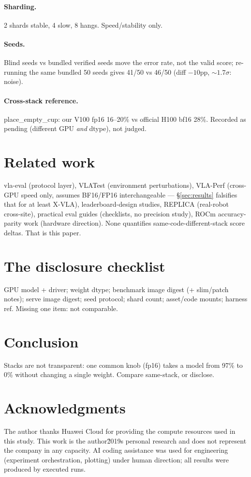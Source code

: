 \documentclass[journal]{IEEEtran}
\begin{document}
\paragraph{Sharding.} 2 shards stable, 4 slow, 8 hangs. Speed/stability only.

\paragraph{Seeds.} Blind seeds vs bundled verified seeds move the error rate,
not the valid score; re-running the same bundled 50 seeds gives 41/50 vs
46/50 (diff $-10$pp, ${\sim}1.7\sigma$: noise).

\paragraph{Cross-stack reference.} place\_empty\_cup: our V100 fp16 16--20\%
vs official H100 bf16 28\%. Recorded as pending (different GPU \emph{and}
dtype), not judged.

\section{Related work}
vla-eval (protocol layer), VLATest (environment perturbations),
VLA-Perf (cross-GPU speed only, assumes BF16/FP16 interchangeable --- \S\ref{sec:results}
falsifies that for at least X-VLA), leaderboard-design studies, REPLICA
(real-robot cross-site), practical eval guides (checklists, no precision
study), ROCm accuracy-parity work (hardware direction). None quantifies
same-code-different-stack score deltas. That is this paper.

\section{The disclosure checklist}
GPU model + driver; weight dtype; benchmark image digest (+ slim/patch
notes); serve image digest; seed protocol; shard count; asset/code mounts;
harness ref. Missing one item: not comparable.

\section{Conclusion}
Stacks are not transparent: one common knob (fp16) takes a model from 97\%
to 0\% without changing a single weight. Compare same-stack, or disclose.

\section*{Acknowledgments}
The author thanks Huawei Cloud for providing the compute resources used in this study. This work is the author\u2019s personal research and does not represent the company in any capacity. AI coding assistance was used for
engineering (experiment orchestration, plotting) under human direction; all
results were produced by executed runs.
\end{document}
